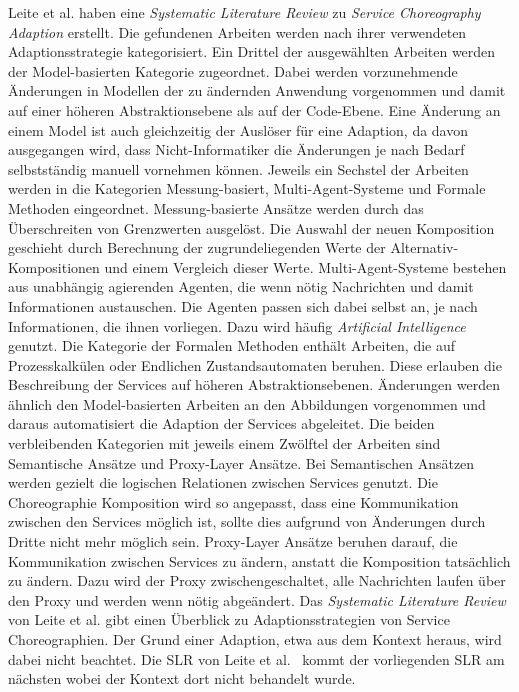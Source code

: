 \documentclass[conference,compsoc]{IEEEtran}
\begin{document}
Leite et al. \cite{leite2013systematic} haben eine \textit{Systematic Literature Review} zu \textit{Service Choreography Adaption} erstellt. Die gefundenen Arbeiten werden nach ihrer verwendeten Adaptionsstrategie kategorisiert. Ein Drittel der ausgewählten Arbeiten werden der Model-basierten Kategorie zugeordnet. Dabei werden vorzunehmende Änderungen in Modellen der zu ändernden Anwendung vorgenommen und damit auf einer höheren Abstraktionsebene als auf der Code-Ebene. Eine Änderung an einem Model ist auch gleichzeitig der Auslöser für eine Adaption, da davon ausgegangen wird, dass Nicht-Informatiker die Änderungen je nach Bedarf selbstständig manuell vornehmen können. Jeweils ein Sechstel der Arbeiten werden in die Kategorien Messung-basiert, Multi-Agent-Systeme und Formale Methoden eingeordnet. Messung-basierte Ansätze werden durch das Überschreiten von Grenzwerten ausgelöst. Die Auswahl der neuen Komposition geschieht durch Berechnung der zugrundeliegenden Werte der Alternativ-Kompositionen und einem Vergleich dieser Werte. Multi-Agent-Systeme bestehen aus unabhängig agierenden Agenten, die wenn nötig Nachrichten und damit Informationen austauschen. Die Agenten passen sich dabei selbst an, je nach Informationen, die ihnen vorliegen. Dazu wird häufig \textit{Artificial Intelligence} genutzt. Die Kategorie der Formalen Methoden enthält Arbeiten, die auf Prozesskalkülen oder Endlichen Zustandsautomaten beruhen. Diese erlauben die Beschreibung der Services auf höheren Abstraktionsebenen. Änderungen werden ähnlich den Model-basierten Arbeiten an den Abbildungen vorgenommen und daraus automatisiert die Adaption der Services abgeleitet. Die beiden verbleibenden Kategorien mit jeweils einem Zwölftel der Arbeiten sind Semantische Ansätze und Proxy-Layer Ansätze. Bei Semantischen Ansätzen werden gezielt die logischen Relationen zwischen Services genutzt. Die Choreographie Komposition wird so angepasst, dass eine Kommunikation zwischen den Services möglich ist, sollte dies aufgrund von Änderungen durch Dritte nicht mehr möglich sein. Proxy-Layer Ansätze beruhen darauf, die Kommunikation zwischen Services zu ändern, anstatt die Komposition tatsächlich zu ändern. Dazu wird der Proxy zwischengeschaltet, alle Nachrichten laufen über den Proxy und werden wenn nötig abgeändert.
Das \textit{Systematic Literature Review} von Leite et al. \cite{leite2013systematic} gibt einen Überblick zu Adaptionsstrategien von Service Choreographien. Der Grund einer Adaption, etwa aus dem Kontext heraus, wird dabei nicht beachtet.
Die SLR von Leite et al.~\cite{leite2013systematic} kommt der vorliegenden SLR am nächsten wobei der Kontext dort nicht behandelt wurde.
\end{document}
